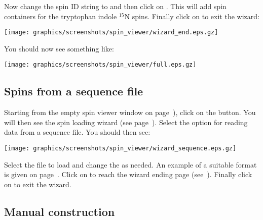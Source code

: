 Now change the spin ID string to  and then click on .  This will add spin containers for the tryptophan indole $^{15}$N spins.  Finally click on  to exit the wizard:

\begin{minipage}[h]{\linewidth}
\centerline{\texttt{[image: graphics/screenshots/spin\_viewer/wizard\_end.eps.gz]}}
\label{figure: spin viewer end}
\end{minipage}

You should now see something like:

\begin{minipage}[h]{\linewidth}
\centerline{\texttt{[image: graphics/screenshots/spin\_viewer/full.eps.gz]}}
\end{minipage}




\subsection{Spins from a sequence file} \label{sect: GUI - sequence file}

Starting from the empty spin viewer window on page~\pageref{figure: spin viewer blank}), click on the  button.  You will then see the spin loading wizard (see page~\pageref{figure: spin viewer wizard start}).  Select the option for reading data from a sequence file.  You should then see:

\begin{minipage}[h]{\linewidth}
\centerline{\texttt{[image: graphics/screenshots/spin\_viewer/wizard\_sequence.eps.gz]}}
\end{minipage}

Select the file to load and change the  as needed.  An example of a suitable format is given on page~\pageref{verb: noe.500.out}.  Click on  to reach the wizard ending page (see~\pageref{figure: spin viewer end}).  Finally click on  to exit the wizard.



\subsection{Manual construction} \label{sect: GUI - manual construction}

